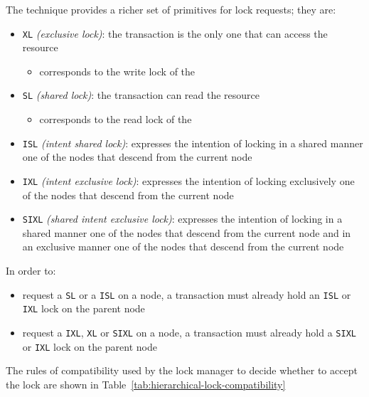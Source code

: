 \documentclass[english]{article}
\begin{document}
\bigskip
The technique provides a richer set of primitives for lock requests; they are:

\begin{itemize}
  \item \texttt{XL} \textit{(exclusive lock)}: the transaction is the only one that can access the resource
        \begin{itemize}[label=\(\rightarrow\)]
          \item corresponds to the write lock of the \TPL
        \end{itemize}
  \item \texttt{SL} \textit{(shared lock)}: the transaction can read the resource
        \begin{itemize}[label=\(\rightarrow\)]
          \item corresponds to the read lock of the \TPL
        \end{itemize}
  \item \texttt{ISL} \textit{(intent shared lock)}: expresses the intention of locking in a shared manner one of the nodes that descend from the current node
  \item \texttt{IXL} \textit{(intent exclusive lock)}: expresses the intention of locking exclusively one of the nodes that descend from the current node
  \item \texttt{SIXL} \textit{(shared intent exclusive lock)}: expresses the intention of locking in a shared manner one of the nodes that descend from the current node and in an exclusive manner one of the nodes that descend from the current node
\end{itemize}

In order to:

\begin{itemize}
  \item request a \texttt{SL} or a \texttt{ISL} on a node, a transaction must already hold an \texttt{ISL} or \texttt{IXL} lock on the parent node
  \item request a \texttt{IXL}, \texttt{XL} or \texttt{SIXL} on a node, a transaction must already hold a \texttt{SIXL} or \texttt{IXL} lock on the parent node
\end{itemize}

\bigskip
The rules of compatibility used by the lock manager to decide whether to accept the lock are shown in Table~\ref{tab:hierarchical-lock-compatibility}
\end{document}
